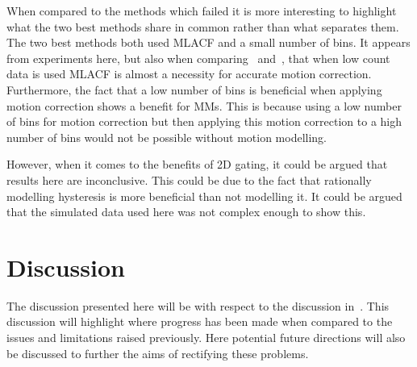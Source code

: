             When compared to the methods which failed it is more interesting to highlight what the two best methods share in common rather than what separates them. The two best methods both used \gls{MLACF} and a small number of bins. It appears from experiments here, but also when comparing~ and~, that when low count data is used \gls{MLACF} is almost a necessity for accurate motion correction. Furthermore, the fact that a low number of bins is beneficial when applying motion correction shows a benefit for \glspl{MM}. This is because using a low number of bins for motion correction but then applying this motion correction to a high number of bins would not be possible without motion modelling.
            
            However, when it comes to the benefits of \gls{2D} gating, it could be argued that results here are inconclusive. This could be due to the fact that rationally modelling hysteresis is more beneficial than not modelling it. It could be argued that the simulated data used here was not complex enough to show this.
        
    \section{Discussion} \label{sec:subsequent_motion_correction_using_advanced_reconstruction_and_gating_methods_with_more_challenging_data_discussion}
        The discussion presented here will be with respect to the discussion in~. This discussion will highlight where progress has been made when compared to the issues and limitations raised previously. Here potential future directions will also be discussed to further the aims of rectifying these problems.

